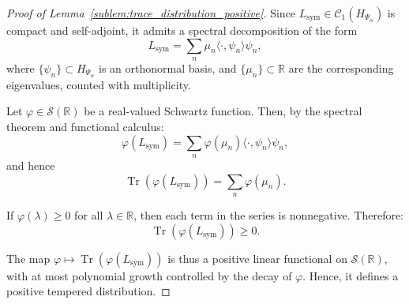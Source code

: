 \begin{proof}[Proof of Lemma~\ref{sublem:trace_distribution_positive}]
Since \( L_{\mathrm{sym}} \in \mathcal{C}_1(H_{\Psi_\alpha}) \) is compact and self-adjoint, it admits a spectral decomposition of the form
\[
L_{\mathrm{sym}} = \sum_n \mu_n \langle \cdot, \psi_n \rangle \psi_n,
\]
where \( \{ \psi_n \} \subset H_{\Psi_\alpha} \) is an orthonormal basis, and \( \{ \mu_n \} \subset \mathbb{R} \) are the corresponding eigenvalues, counted with multiplicity.

Let \( \varphi \in \mathcal{S}(\mathbb{R}) \) be a real-valued Schwartz function. Then, by the spectral theorem and functional calculus:
\[
\varphi(L_{\mathrm{sym}}) = \sum_n \varphi(\mu_n) \langle \cdot, \psi_n \rangle \psi_n,
\]
and hence
\[
\operatorname{Tr}(\varphi(L_{\mathrm{sym}})) = \sum_n \varphi(\mu_n).
\]

If \( \varphi(\lambda) \ge 0 \) for all \( \lambda \in \mathbb{R} \), then each term in the series is nonnegative. Therefore:
\[
\operatorname{Tr}(\varphi(L_{\mathrm{sym}})) \ge 0.
\]

The map \( \varphi \mapsto \operatorname{Tr}(\varphi(L_{\mathrm{sym}})) \) is thus a positive linear functional on \( \mathcal{S}(\mathbb{R}) \), with at most polynomial growth controlled by the decay of \( \varphi \). Hence, it defines a positive tempered distribution.
\end{proof}
